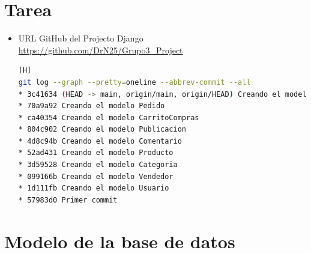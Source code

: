 \documentclass{article}
\begin{document}
	\section{Tarea}
	
\begin{itemize}
    \item URL GitHub del Projecto Django \url{https://github.com/DrN25/Grupo3_Project}
		  \begin{lstlisting}[language=bash,caption={imagen de los commits realizados}][H]
git log --graph --pretty=oneline --abbrev-commit --all
* 3c41634 (HEAD -> main, origin/main, origin/HEAD) Creando el modelo ProductoPedido
* 70a9a92 Creando el modelo Pedido
* ca40354 Creando el modelo CarritoCompras
* 804c902 Creando el modelo Publicacion
* 4d8c94b Creando el modelo Comentario
* 52ad431 Creando el modelo Producto
* 3d59528 Creando el modelo Categoria
* 099166b Creando el modelo Vendedor
* 1d111fb Creando el modelo Usuario
* 57983d0 Primer commit
		  \end{lstlisting}
    
\end{itemize}


	\section{Modelo de la base de datos}
	
\end{document}
